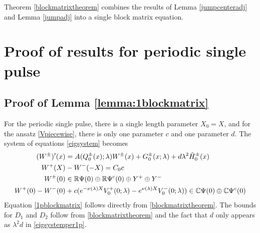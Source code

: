 \documentclass[10pt,reqno]{amsart}
\theoremstyle{plain}
\theoremstyle{definition}
\theoremstyle{remark}
\numberwithin{theorem}{section}
\numberwithin{equation}{section}
\begin{document}
Theorem \ref{blockmatrixtheorem} combines the results of Lemma \ref{jumpcenteradj} and Lemma \ref{jumpadj} into a single block matrix equation.

\section{Proof of results for periodic single pulse }

\subsection{Proof of Lemma \ref{lemma:1blockmatrix} }

For the periodic single pulse, there is a single length parameter $X_0 = X$, and for the ansatz \cref{Vpiecewise}, there is only one parameter $c$ and one parameter $d$. The system of equations \cref{eigsystem} becomes
\begin{equation}\label{eigsystemper1p}
\begin{aligned}
(W^\pm)'(x) &= A(Q_0^\pm(x); \lambda) W^\pm(x) + G_0^\pm(x; \lambda) + d \lambda^2 \tilde{H}_0^\pm(x)  \\
W^+(X) &- W^-(-X) = C_0 c \\
W^\pm(0) &\in \mathbb{R} \Psi(0) \oplus \mathbb{R} \Psi^c(0) \oplus Y^+ \oplus Y^- \\
W^+(0) - W^-(0) &+ c ( e^{-\nu(\lambda)X}V_0^+(0; \lambda) - e^{\nu(\lambda)X} V_0^-(0; \lambda)) \in \mathbb{C} \Psi(0) \oplus \mathbb{C} \Psi^c(0)\end{aligned}
\end{equation}
Equation \cref{1pblockmatrix} follows directly from \cref{blockmatrixtheorem}. The bounds for $D_1$ and $D_2$ follow from \cref{blockmatrixtheorem} and the fact that $d$ only appears as $\lambda^2 d$ in \cref{eigsystemper1p}. 
\end{document}
